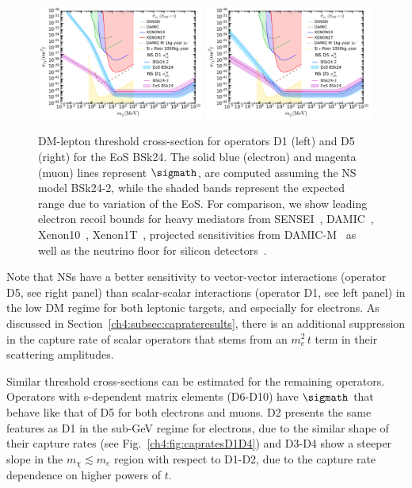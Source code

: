 \begin{figure}[t!bp]
    \centering
    \includegraphics[width=0.49\textwidth]{capture_2/DD_NS_leptons.pdf}
    \includegraphics[width=0.49\textwidth]{capture_2/DD_NS_leptons_D5.pdf}
    \caption{DM-lepton threshold cross-section for operators D1 (left) and D5 (right) for the EoS BSk24. The solid blue (electron) and magenta (muon) lines represent $\sigmath$, are computed assuming the NS model BSk24-2, while the shaded bands represent the expected range due to variation of the EoS. For comparison, we show leading electron recoil bounds for heavy mediators from SENSEI~\cite{SENSEI:2020dpa_oct_SENSEIDirectDetectionResults}, DAMIC~\cite{DAMIC:2019dcn_Constraintslightdark}, Xenon10~\cite{Essig:2017kqs_Newconstraintsprospects}, Xenon1T~\cite{XENON:2019gfn_Lightdarkmatter}, projected sensitivities from DAMIC-M~\cite{Essig:2015cda_DirectdetectionsubGeV} as well as the neutrino floor for silicon detectors~\cite{Essig:2018tss_Solarneutrinossignal}.}
        \label{ch4:fig:sigmathe}
\end{figure}

Note that NSs have a better sensitivity to vector-vector interactions (operator D5, see right panel) than scalar-scalar interactions (operator D1, see left panel) in the low DM regime for both leptonic targets, and especially for electrons. As discussed in Section~\ref{ch4:subsec:caprateresults}, there is an additional suppression in the capture rate of scalar operators that stems from an $m_e^2 \, t$ term in their scattering amplitudes. 

Similar threshold cross-sections can be estimated for the remaining operators.  Operators with s-dependent matrix elements (D6-D10) have  $\sigmath$ that behave like that of D5 for both electrons and muons. D2 presents the same features as D1 in the sub-GeV regime for electrons, due to the similar shape of their capture rates (see Fig.~\ref{ch4:fig:capratesD1D4}) and D3-D4 show a steeper slope in the $m_\chi\lesssim m_e$ region with respect to D1-D2, due to the capture rate dependence on higher powers of $t$. 



